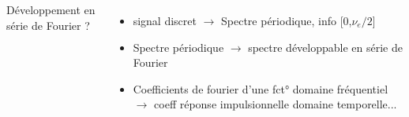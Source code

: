 \documentclass{beamer}
\begin{document}
\begin{frame}
\begin{columns}
\column{60mm}
Développement en série de Fourier ? \\
\vspace{0.1cm}
\begin{itemize}
\item<2->   signal discret $\rightarrow$ Spectre périodique, info [0,$\nu_e/2$]
\vspace{0.1cm}
\item<3-> Spectre périodique  $\rightarrow$ spectre développable en série de Fourier 
\vspace{0.1cm}
\item<4-> Coefficients de fourier d'une fct° domaine fréquentiel $\rightarrow$ coeff réponse impulsionnelle domaine temporelle...
\end{itemize}

\end{columns}

\end{frame}
\end{document}
